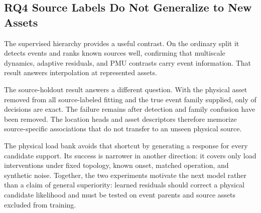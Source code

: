 \subsection{RQ4 Source Labels Do Not Generalize to New Assets}

The supervised hierarchy provides a useful contrast. On the ordinary split it detects events and ranks known sources well, confirming that multiscale dynamics, adaptive residuals, and PMU contrasts carry event information. That result answers interpolation at represented assets.

The source-holdout result answers a different question. With the physical asset removed from all source-labeled fitting and the true event family supplied, only \HeldSourceCorrect{} of \HeldSourceDecisions{} decisions are exact. The failure remains after detection and family confusion have been removed. The location heads and asset descriptors therefore memorize source-specific associations that do not transfer to an unseen physical source.

The physical load bank avoids that shortcut by generating a response for every candidate support. Its success is narrower in another direction: it covers only load interventions under fixed topology, known onset, matched operation, and synthetic noise. Together, the two experiments motivate the next model rather than a claim of general superiority: learned residuals should correct a physical candidate likelihood and must be tested on event parents and source assets excluded from training.
